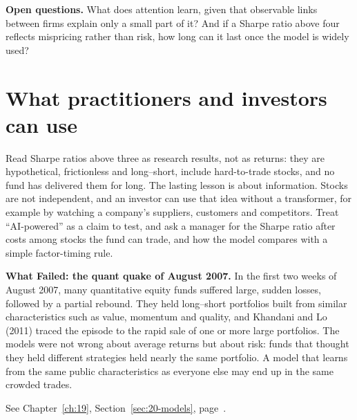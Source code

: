 \label{sec:22-open}
\textbf{Open questions.} What does attention learn, given that observable links between firms explain only a small part of it? And if a Sharpe ratio above four reflects mispricing rather than risk, how long can it last once the model is widely used?

\section{What practitioners and investors can use}
\label{sec:22-investors}

Read Sharpe ratios above three as research results, not as returns: they are hypothetical, frictionless and long--short, include hard-to-trade stocks, and no fund has delivered them for long. The lasting lesson is about information. Stocks are not independent, and an investor can use that idea without a transformer, for example by watching a company's suppliers, customers and competitors. Treat ``AI-powered'' as a claim to test, and ask a manager for the Sharpe ratio after costs among stocks the fund can trade, and how the model compares with a simple factor-timing rule.

\begin{callout}
\textbf{What Failed: the quant quake of August 2007.} In the first two weeks of August 2007, many quantitative equity funds suffered large, sudden losses, followed by a partial rebound. They held long--short portfolios built from similar characteristics such as value, momentum and quality, and Khandani and Lo (2011) traced the episode to the rapid sale of one or more large portfolios. The models were not wrong about average returns but about risk: funds that thought they held different strategies held nearly the same portfolio. A model that learns from the same public characteristics as everyone else may end up in the same crowded trades.
\end{callout}

\makeatletter
{}
\makeatother

\begin{keyterms}
\small
\begin{description}[leftmargin=0pt, itemsep=2pt, parsep=0pt, font=\normalfont\bfseries\color{FEMaroon}]
  \item[Principal components.] See Chapter~\ref{ch:19}, Section~\ref{sec:20-models}, page~\pageref{sec:20-models}.
\end{description}
\end{keyterms}
